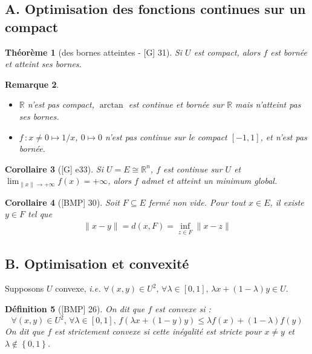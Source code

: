 \documentclass[10pt, a4paper, parskip=full, twoside, twocolumn]{report}
\newtheorem{definition}{Définition}
\newtheorem{theorem}[definition]{Théorème}
\newtheorem{corollary}[definition]{Corollaire}
\newtheorem{remark}[definition]{Remarque}
\newcommand{\IR}{\mathbb{R}}
\begin{document}
\subsection*{A. Optimisation des fonctions continues sur un compact}
\begin{theorem}[des bornes atteintes - \textnormal{[G] 31}]
	Si $U$ est compact, alors $f$ est bornée et atteint ses bornes.
\end{theorem}

\begin{remark}
	\begin{itemize}
		\item $\IR$ n'est pas compact, $\arctan$ est continue et bornée sur $\IR$ mais n'atteint pas ses bornes.
		\item $f\,\colon x\neq 0\mapsto 1/x$, $0\mapsto 0$ n'est pas continue sur le compact $[-1,1]$, et n'est pas bornée.
	\end{itemize}
\end{remark}

\begin{corollary}[\textnormal{[G] e33}]
	Si $U = E\cong \IR^n$, $f$ est continue sur $U$ et $\lim_{\|x\|\to +\infty} f(x) = +\infty$, alors $f$ admet et atteint un minimum global.
\end{corollary}

\begin{corollary}[\textnormal{[BMP] 30}]
	Soit $F\subseteq E$ fermé non vide. Pour tout $x\in E$, il existe $y\in F$ tel que
	\begin{align*}
		\|x-y\| = d(x,F) = \inf_{z\in F} \|x-z\|
	\end{align*}
\end{corollary}

\subsection*{B. Optimisation et convexité}
\textcolor{paragraphtext}{Supposons $U$ convexe, \emph{i.e.} $\forall(x,y)\in U^2,\,\forall \lambda\in[0,1],\, \lambda x + (1-\lambda)y \in U$.}

\begin{definition}[\textnormal{[BMP] 26}]
	On dit que $f$ est \emph{convexe} si :
	$$\forall (x,y)\in U^2,\,\forall \lambda\in [0,1],\, f(\lambda x + (1-y)y) \leq \lambda f(x) + (1-\lambda)f(y)$$
	On dit que $f$ est \emph{strictement convexe} si cette inégalité est stricte pour $x\neq y$ et $\lambda\notin \left\{0,1\right\}$.
\end{definition}
\end{document}
